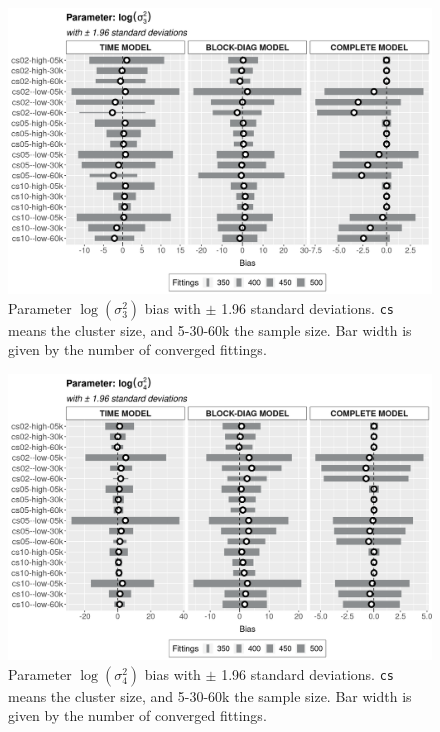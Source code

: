 \documentclass[a4paper,12pt]{article}
\begin{document}
\vspace{-0.514cm}
\begin{figure}[H]
 \centering
 \includegraphics[width=\linewidth]{pics/bias2plotsd-9.png}
 \vspace{-0.75cm}
 \caption{Parameter \(\log(\sigma_{3}^{2})\) bias with \(\pm\) 1.96
   standard deviations. \texttt{cs} means the cluster size, and 5-30-60k
   the sample size. Bar width is given by the number of converged
   fittings.}
 \label{fig:biassdlogs2_3}
\end{figure}

\begin{figure}[H]
 \centering
 \includegraphics[width=\linewidth]{pics/bias2plotsd-10.png}
 \vspace{-0.75cm}
 \caption{Parameter \(\log(\sigma_{4}^{2})\) bias with \(\pm\) 1.96
   standard deviations. \texttt{cs} means the cluster size, and 5-30-60k
   the sample size. Bar width is given by the number of converged
   fittings.}
 \label{fig:biassdlogs2_4}
\end{figure}
\end{document}
